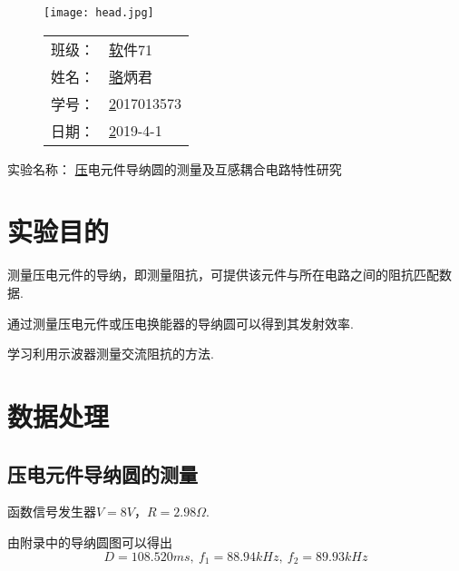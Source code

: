 \documentclass{thureport}
\newcommand{\major}{软件71}
\newcommand{\name}{骆炳君}
\newcommand{\stuid}{2017013573}
\newcommand{\newdate}{2019-4-1}
\newcommand{\newtitle}{压电元件导纳圆的测量及互感耦合电路特性研究}
\begin{document}
\thispagestyle{empty}
\begin{figure}[h]
	\begin{minipage}{0.65\linewidth}
		\centerline{\texttt{[image: head.jpg]}}
	\end{minipage}
	\hfill
	\begin{minipage}{.3\linewidth}
		\raggedleft
		\begin{tabular*}{.8\linewidth}{ll}
			班级： & \underline\major   \\
			姓名： & \underline\name    \\
			学号： & \underline\stuid   \\
			日期： & \underline\newdate
		\end{tabular*}
	\end{minipage}
\end{figure}

\begin{table}[!htbp]
	\centering\large
	实验名称： \underline\newtitle
\end{table}

\tableofcontents
\newpage

\section{实验目的}
\begin{clause}
	\item 测量压电元件的导纳，即测量阻抗，可提供该元件与所在电路之间的阻抗匹配数据.
	\item 通过测量压电元件或压电换能器的导纳圆可以得到其发射效率.
	\item 学习利用示波器测量交流阻抗的方法.
\end{clause}

\section{数据处理}
\subsection{压电元件导纳圆的测量}
函数信号发生器$V=8V$，$R=2.98\Omega$.

由附录中的导纳圆图可以得出
$$D=108.520ms,\ f_1=88.94kHz,\ f_2=89.93kHz$$
\end{document}
